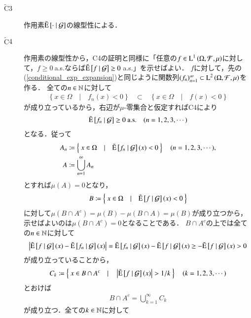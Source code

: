 \begin{prf}
\begin{description}
			\item[$\tilde{\mathrm{C}}$3]	
				作用素$\tilde{\operatorname{E}} \left[ \cdot \ \middle|\ \mathcal{G} \right]$の線型性による．

			\item[$\tilde{\mathrm{C}}$4]	
				作用素の線型性から，C4の証明と同様に「任意の$f \in \operatorname{L}^{1} \left(\Omega, \mathcal{F},\mu\right)$に対して，$f \geq 0\ $a.s.ならば$\tcexp{f}{\mathcal{G}} \geq 0\ $a.s.」を示せばよい．
				$f$に対して，先の(\ref{conditional_exp_expansion})と同じように関数列$(f_n)_{n=1}^{\infty} \subset \operatorname{L}^{2} \left(\Omega,\mathcal{F},\mu\right)$を作る．
				全ての$n \in \mathbb{N}$に対して
				\begin{align}
					\{\ x \in \Omega\quad |\quad f_n(x) < 0\ \} \quad\subset\quad \{\ x \in \Omega\quad |\quad f(x) < 0\ \}
				\end{align}
				が成り立っているから，右辺が$\mu$-零集合と仮定すればC4により
				\begin{align}
					\tilde{\operatorname{E}} \left[ f_n \ \middle|\ \mathcal{G} \right] \geq 0\ \mathrm{a.s.} \quad (n = 1,2,3,\cdots)
				\end{align}
				となる．従って
				\begin{align}
					A_n &\coloneqq \left\{\ x \in \Omega\quad |\quad \tilde{\operatorname{E}} \left[ f_n \ \middle|\ \mathcal{G} \right](x) < 0\ \right\} \quad (n=1,2,3,\cdots), \\
					A &\coloneqq \bigcup_{n=1}^{\infty} A_n
				\end{align}
				とすれば$\mu(A) = 0$となり，
				\begin{align}
					B \coloneqq \left\{\ x \in \Omega\quad |\quad \tilde{\operatorname{E}} \left[ f \ \middle|\ \mathcal{G} \right](x) < 0\ \right\}
				\end{align}
				に対して$\mu(B \cap A^c) = \mu(B) - \mu(B \cap A) = \mu(B)$が成り立つから，示せばよいのは$\mu(B \cap A^c) = 0$となることである．
				$B \cap A^c$の上では全ての$n \in \mathbb{N}$に対して
				\begin{align}
					\left| \tilde{\operatorname{E}} \left[ f \ \middle|\ \mathcal{G} \right](x) - \tilde{\operatorname{E}} \left[ f_n \ \middle|\ \mathcal{G} \right](x) \right| 
					= \tilde{\operatorname{E}} \left[ f_n \ \middle|\ \mathcal{G} \right](x) - \tilde{\operatorname{E}} \left[ f \ \middle|\ \mathcal{G} \right](x) \geq - \tilde{\operatorname{E}} \left[ f \ \middle|\ \mathcal{G} \right](x) > 0
				\end{align}
				が成り立っていることから，
				\begin{align}
					C_k \coloneqq \left\{\ x \in B \cap A^c\quad |\quad \left| \tilde{\operatorname{E}} \left[ f \ \middle|\ \mathcal{G} \right](x)\right| > 1/k\ \right\} \quad (k = 1,2,3,\cdots)
				\end{align}
				とおけば
				\begin{align}
					B \cap A^c = \bigcup_{k=1}^{\infty} C_k
				\end{align}
				が成り立つ．全ての$k \in \mathbb{N}$に対して

\end{description}
\end{prf}
